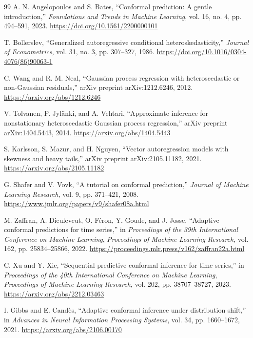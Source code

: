 \documentclass[review,number,sort&compress]{elsarticle}
\begin{document}
\begin{thebibliography}{99}
A. N. Angelopoulos and S. Bates, ``Conformal prediction: A gentle introduction,'' \emph{Foundations and Trends in Machine Learning}, vol. 16, no. 4, pp. 494--591, 2023. \url{https://doi.org/10.1561/2200000101}

T. Bollerslev, ``Generalized autoregressive conditional heteroskedasticity,'' \emph{Journal of Econometrics}, vol. 31, no. 3, pp. 307--327, 1986. \url{https://doi.org/10.1016/0304-4076(86)90063-1}

C. Wang and R. M. Neal, ``Gaussian process regression with heteroscedastic or non-Gaussian residuals,'' arXiv preprint arXiv:1212.6246, 2012. \url{https://arxiv.org/abs/1212.6246}

V. Tolvanen, P. Jyl\"anki, and A. Vehtari, ``Approximate inference for nonstationary heteroscedastic Gaussian process regression,'' arXiv preprint arXiv:1404.5443, 2014. \url{https://arxiv.org/abs/1404.5443}

S. Karlsson, S. Mazur, and H. Nguyen, ``Vector autoregression models with skewness and heavy tails,'' arXiv preprint arXiv:2105.11182, 2021. \url{https://arxiv.org/abs/2105.11182}

G. Shafer and V. Vovk, ``A tutorial on conformal prediction,'' \emph{Journal of Machine Learning Research}, vol. 9, pp. 371--421, 2008. \url{https://www.jmlr.org/papers/v9/shafer08a.html}

M. Zaffran, A. Dieuleveut, O. F\'eron, Y. Goude, and J. Josse, ``Adaptive conformal predictions for time series,'' in \emph{Proceedings of the 39th International Conference on Machine Learning}, \emph{Proceedings of Machine Learning Research}, vol. 162, pp. 25834--25866, 2022. \url{https://proceedings.mlr.press/v162/zaffran22a.html}

C. Xu and Y. Xie, ``Sequential predictive conformal inference for time series,'' in \emph{Proceedings of the 40th International Conference on Machine Learning}, \emph{Proceedings of Machine Learning Research}, vol. 202, pp. 38707--38727, 2023. \url{https://arxiv.org/abs/2212.03463}

I. Gibbs and E. Cand\`es, ``Adaptive conformal inference under distribution shift,'' in \emph{Advances in Neural Information Processing Systems}, vol. 34, pp. 1660--1672, 2021. \url{https://arxiv.org/abs/2106.00170}


\end{thebibliography}
\end{document}
